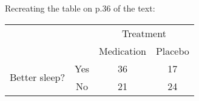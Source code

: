 \documentclass{article}
\begin{document}
Recreating the table on p.36 of the text: \\

\begin{tabular}{|c|c|c|c|}
\cline{3-4}
\multicolumn{2}{c}{} & \multicolumn{2}{|c|}{Treatment} \\
\cline{3-4}
\multicolumn{2}{c|}{} & Medication & Placebo \\
\hline
\multirow{2}{.85in}{Better sleep?} & Yes & 36 & 17 \\
\cline{2-4}
& No & 21 & 24 \\
\hline
\end{tabular}
\end{document}

